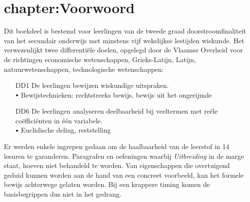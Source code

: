 \documentclass{ximera}
\begin{document}





\section{chapter:Voorwoord}

Dit boekdeel is bestemd voor leerlingen van de tweede graad doorstroomfinaliteit van het secundair onderwijs met minstens vijf wekelijkse lestijden wiskunde. Het verwezenlijkt twee differenti\"ele doelen, opgelegd door de Vlaamse Overheid voor de richtingen economische wetenschappen, Grieks-Latijn, Latijn, natuurwetenschappen, technologische wetenschappen:
\begin{center}
\begin{minipage}{13cm}\itshape
\begin{enumerate}
\item[DD1]
De leerlingen bewijzen wiskundige uitspraken. \\
$\sbullet[.75]$ Bewijstechnieken: rechtstreeks bewijs, bewijs uit het ongerijmde
\item[DD6]
De leerlingen analyseren deelbaarheid bij veeltermen met re\"ele co\"efficiënten in \'e\'en variabele. \\
$\sbullet[.75]$ Euclidische deling, reststelling
\end{enumerate}
\end{minipage}
\end{center}


 
Er werden enkele ingrepen gedaan om de haalbaarheid van de leerstof in 14 lesuren te garanderen. Paragrafen en oefeningen waarbij \textit{Uitbreiding} in de marge staat, hoeven niet behandeld te worden. Van eigenschappen die overtuigend geduid kunnen worden aan de hand van een concreet voorbeeld, kan het formele bewijs achterwege gelaten worden. Bij een krappere timing komen de basisbegrippen dus niet in het gedrang.
\end{document}
